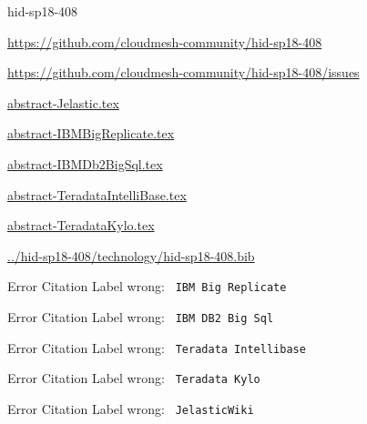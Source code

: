 \begin{IU}

hid-sp18-408

\url{https://github.com/cloudmesh-community/hid-sp18-408}

\url{https://github.com/cloudmesh-community/hid-sp18-408/issues}

\href{https://github.com/cloudmesh-community/hid-sp18-408/blob/master//technology/abstract-Jelastic.tex}{abstract-Jelastic.tex}

\href{https://github.com/cloudmesh-community/hid-sp18-408/blob/master//technology/abstract-IBMBigReplicate.tex}{abstract-IBMBigReplicate.tex}

\href{https://github.com/cloudmesh-community/hid-sp18-408/blob/master//technology/abstract-IBMDb2BigSql.tex}{abstract-IBMDb2BigSql.tex}

\href{https://github.com/cloudmesh-community/hid-sp18-408/blob/master//technology/abstract-TeradataIntelliBase.tex}{abstract-TeradataIntelliBase.tex}

\href{https://github.com/cloudmesh-community/hid-sp18-408/blob/master//technology/abstract-TeradataKylo.tex}{abstract-TeradataKylo.tex}

\href{https://github.com/cloudmesh-community/hid-sp18-408/blob/master//technology/hid-sp18-408.bib}{../hid-sp18-408/technology/hid-sp18-408.bib}

 Error Citation Label wrong: \verb| IBM Big Replicate |

 Error Citation Label wrong: \verb| IBM DB2 Big Sql |

 Error Citation Label wrong: \verb| Teradata Intellibase |

 Error Citation Label wrong: \verb| Teradata Kylo |

 Error Citation Label wrong: \verb| JelasticWiki |

\end{IU}


